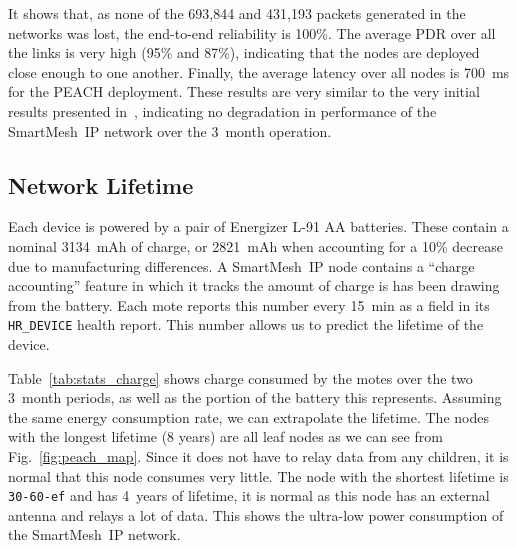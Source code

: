 \documentclass{elsarticle}
\newcommand{\smip}                {SmartMesh~IP\xspace}
\newcommand{\HRDEVICE}            {{\tt HR\_DEVICE}\xspace}
\newcommand{\PEACHNUMPCKTS}       {693,844\xspace}
\newcommand{\EVANUMPCKTS}         {431,193\xspace}
\begin{document}
It shows that, as none of the \PEACHNUMPCKTS and \EVANUMPCKTS packets generated in the networks was lost, the end-to-end reliability is 100\%.
The average PDR over all the links is very high (95\% and 87\%), indicating that the nodes are deployed close enough to one another.
Finally, the average latency over all nodes is 700~ms for the PEACH deployment.
These results are very similar to the very initial results presented in~\cite{watteyne16peach}, indicating no degradation in performance of the \smip network over the 3~month operation.

\subsection{Network Lifetime}
\label{sec:lifetime}


Each device is powered by a pair of Energizer L-91 AA batteries.
These contain a nominal 3134~mAh of charge, or 2821~mAh when accounting for a 10\% decrease due to manufacturing differences.
A \smip node contains a ``charge accounting'' feature in which it tracks the amount of charge is has been drawing from the battery.
Each mote reports this number every 15~min as a field in its \HRDEVICE health report.
This number allows us to predict the lifetime of the device.


Table~\ref{tab:stats_charge} shows charge consumed by the motes over the two 3~month periods, as well as the portion of the battery this represents.
Assuming the same energy consumption rate, we can extrapolate the lifetime.
The nodes with the longest lifetime (8 years) are all leaf nodes as we can see from Fig.~\ref{fig:peach_map}.
Since it does not have to relay data from any children, it is normal that this node consumes very little.
The node with the shortest lifetime is {\tt 30-60-ef} and has 4~years of lifetime, it is normal as this node has an external antenna and relays a lot of data.
This shows the ultra-low power consumption of the \smip network.
\end{document}
